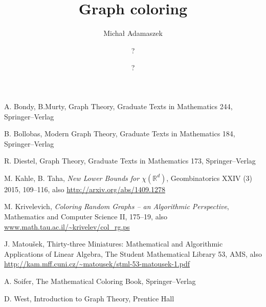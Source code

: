 \documentclass[a4paper,oneside]{report}
\title{\bf Graph coloring}
\author{Micha{\l} Adamaszek \and ? \and ?}
\theoremstyle{plain}
\theoremstyle{myremark}
\newcommand{\real}{\mathbb{R}}
\begin{document}
\maketitle
\tableofcontents














\begin{thebibliography}{99}
 A. Bondy, B.Murty, Graph Theory, Graduate Texts in Mathematics 244, Springer--Verlag  

 B. Bollobas, Modern Graph Theory, Graduate Texts in Mathematics 184, Springer--Verlag

 R. Diestel, Graph Theory, Graduate Texts in Mathematics 173, Springer--Verlag  

 M. Kahle, B. Taha, \textit{New Lower Bounds for $\chi(\real^d)$}, Geombinatorics XXIV (3) 2015, 109--116, also \url{http://arxiv.org/abs/1409.1278}

 M. Krivelevich, \textit{Coloring Random Graphs -- an Algorithmic Perspective}, Mathematics and Computer Science II, 175--19, also \url{www.math.tau.ac.il/~krivelev/col_rg.ps}

 J. Matou\v{s}ek, Thirty-three Miniatures: Mathematical and Algorithmic Applications of Linear Algebra, The Student Mathematical Library 53, AMS, also \url{http://kam.mff.cuni.cz/~matousek/stml-53-matousek-1.pdf} 

 A. Soifer, The Mathematical Coloring Book, Springer--Verlag

 D. West, Introduction to Graph Theory, Prentice Hall

\end{thebibliography}
\end{document}
